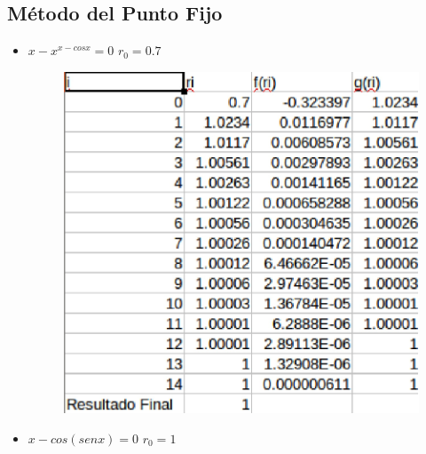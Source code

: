 \documentclass[a4paper,12pt]{article}
\begin{document}
    \subsection{Método del Punto Fijo}
    
    \begin{itemize}
    \item $x-x^{x-cosx} = 0$ $r_{0} = 0.7$
     
     \begin{figure}[H]
      \centering
      \includegraphics[scale = 0.6]{71.eps}
     \end{figure}
   
   \newpage
    
    \item $x-cos(senx) = 0$ $r_{0} = 1$
      

\end{itemize}
\end{document}

